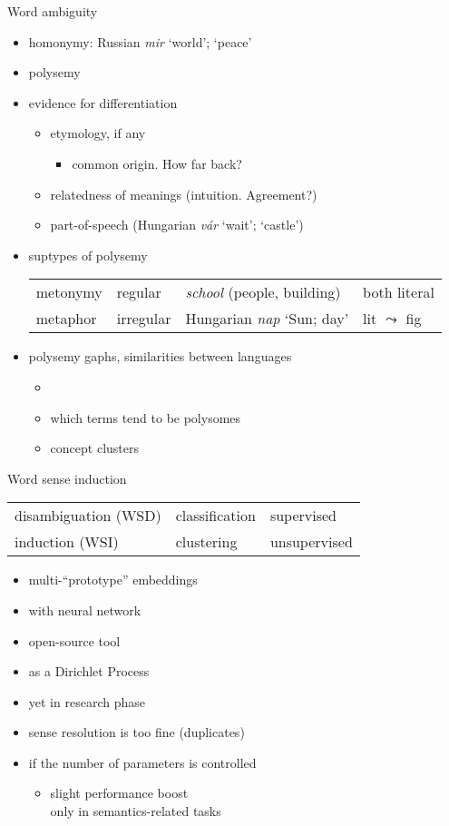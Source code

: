 \documentclass[10pt]{beamer}%
\newcommand{\bull}[1]{\begin{itemize}\item #1 \end{itemize}}
\begin{document}
\begin{frame}{Word ambiguity}
  \begin{itemize}
    \item homonymy: Russian \emph{mir} `world'; `peace'
    \item polysemy
    \item evidence for differentiation
      \begin{itemize}
        \item etymology, if any
          \bull{common origin. How far back?}
        \item relatedness of meanings (intuition. Agreement?)
        \item part-of-speech (Hungarian \emph{vár} `wait'; `castle')
      \end{itemize}
    \item suptypes of polysemy
      \begin{tabular}{llll}
        metonymy & regular    & \emph{school} (people, building)  & both literal \\
        metaphor & irregular  & Hungarian \emph{nap} `Sun; day'   & lit $\leadsto$ fig
      \end{tabular}
    \item polysemy gaphs, similarities between languages 
      \begin{itemize}
        \item \citep{Youn:2016}
        \item which terms tend to be polysomes 
        \item concept clusters
      \end{itemize}
  \end{itemize}
\end{frame}
\begin{frame}{Word sense induction}
  \begin{tabular} {lll}
    disambiguation (WSD) & classification & supervised \\
    induction (WSI) \citep{Schutze:1998} & clustering & unsupervised \\
  \end{tabular}
    \begin{itemize}
      \item multi-``prototype'' embeddings \citep{Reisinger:2010}
      \item with neural network \citep{Huang:2012}
      \item open-source tool \citep{Neelakantan:2014}
      \item as a Dirichlet Process \cite{Li:2015,Bartunov:2015}
      \item yet in research phase
      \item sense resolution is too fine (duplicates)
      \item if the number of parameters is controlled 
        \begin{itemize}
          \item slight performance boost \\ 
            only in semantics-related tasks \citep{Li:2015}
        \end{itemize}
    \end{itemize}
\end{frame}
\end{document}
